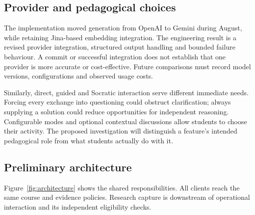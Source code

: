 \documentclass[11pt,a4paper]{article}
\begin{document}
\subsection{Provider and pedagogical choices}
The implementation moved generation from OpenAI to Gemini during August, while retaining Jina-based embedding integration. The engineering result is a revised provider integration, structured output handling and bounded failure behaviour. A commit or successful integration does not establish that one provider is more accurate or cost-effective. Future comparisons must record model versions, configurations and observed usage costs.

Similarly, direct, guided and Socratic interaction serve different immediate needs. Forcing every exchange into questioning could obstruct clarification; always supplying a solution could reduce opportunities for independent reasoning. Configurable modes and optional contextual discussions allow students to choose their activity. The proposed investigation will distinguish a feature's intended pedagogical role from what students actually do with it.

\subsection{Preliminary architecture}
Figure~\ref{fig:architecture} shows the shared responsibilities. All clients reach the same course and evidence policies. Research capture is downstream of operational interaction and its independent eligibility checks.
\end{document}
